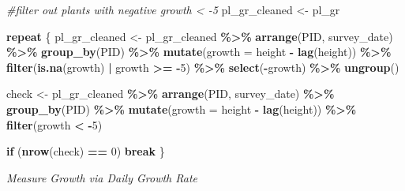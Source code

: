 \documentclass[
]{article}
\newenvironment{Shaded}{\begin{snugshade}}{\end{snugshade}}
\newcommand{\AttributeTok}[1]{\textcolor[rgb]{0.13,0.29,0.53}{#1}}
\newcommand{\CommentTok}[1]{\textcolor[rgb]{0.56,0.35,0.01}{\textit{#1}}}
\newcommand{\ControlFlowTok}[1]{\textcolor[rgb]{0.13,0.29,0.53}{\textbf{#1}}}
\newcommand{\DecValTok}[1]{\textcolor[rgb]{0.00,0.00,0.81}{#1}}
\newcommand{\FunctionTok}[1]{\textcolor[rgb]{0.13,0.29,0.53}{\textbf{#1}}}
\newcommand{\NormalTok}[1]{#1}
\newcommand{\OtherTok}[1]{\textcolor[rgb]{0.56,0.35,0.01}{#1}}
\newcommand{\SpecialCharTok}[1]{\textcolor[rgb]{0.81,0.36,0.00}{\textbf{#1}}}
\begin{document}
\begin{Shaded}
\begin{Highlighting}[]
\CommentTok{\#filter out plants with negative growth \textless{} {-}5}
\NormalTok{pl\_gr\_cleaned }\OtherTok{\textless{}{-}}\NormalTok{ pl\_gr}

\ControlFlowTok{repeat}\NormalTok{ \{}
\NormalTok{  pl\_gr\_cleaned }\OtherTok{\textless{}{-}}\NormalTok{ pl\_gr\_cleaned }\SpecialCharTok{\%\textgreater{}\%}
    \FunctionTok{arrange}\NormalTok{(PID, survey\_date) }\SpecialCharTok{\%\textgreater{}\%}
    \FunctionTok{group\_by}\NormalTok{(PID) }\SpecialCharTok{\%\textgreater{}\%}
    \FunctionTok{mutate}\NormalTok{(}\AttributeTok{growth =}\NormalTok{ height }\SpecialCharTok{{-}} \FunctionTok{lag}\NormalTok{(height)) }\SpecialCharTok{\%\textgreater{}\%}
    \FunctionTok{filter}\NormalTok{(}\FunctionTok{is.na}\NormalTok{(growth) }\SpecialCharTok{|}\NormalTok{ growth }\SpecialCharTok{\textgreater{}=} \SpecialCharTok{{-}}\DecValTok{5}\NormalTok{) }\SpecialCharTok{\%\textgreater{}\%}
    \FunctionTok{select}\NormalTok{(}\SpecialCharTok{{-}}\NormalTok{growth) }\SpecialCharTok{\%\textgreater{}\%}
    \FunctionTok{ungroup}\NormalTok{()}

\NormalTok{  check }\OtherTok{\textless{}{-}}\NormalTok{ pl\_gr\_cleaned }\SpecialCharTok{\%\textgreater{}\%}
    \FunctionTok{arrange}\NormalTok{(PID, survey\_date) }\SpecialCharTok{\%\textgreater{}\%}
    \FunctionTok{group\_by}\NormalTok{(PID) }\SpecialCharTok{\%\textgreater{}\%}
    \FunctionTok{mutate}\NormalTok{(}\AttributeTok{growth =}\NormalTok{ height }\SpecialCharTok{{-}} \FunctionTok{lag}\NormalTok{(height)) }\SpecialCharTok{\%\textgreater{}\%}
    \FunctionTok{filter}\NormalTok{(growth }\SpecialCharTok{\textless{}} \SpecialCharTok{{-}}\DecValTok{5}\NormalTok{)}
  
  \ControlFlowTok{if}\NormalTok{ (}\FunctionTok{nrow}\NormalTok{(check) }\SpecialCharTok{==} \DecValTok{0}\NormalTok{) }\ControlFlowTok{break}
\NormalTok{\}}
\end{Highlighting}
\end{Shaded}

\emph{Measure Growth via Daily Growth Rate}
\end{document}
